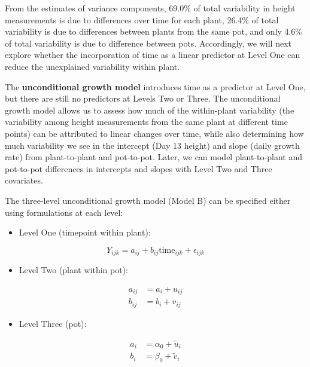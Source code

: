 \documentclass[
]{krantz}
\providecommand{\tightlist}{%
  \setlength{\itemsep}{0pt}\setlength{\parskip}{0pt}}
\begin{document}
From the estimates of variance components, 69.0\% of total variability in height measurements is due to differences over time for each plant, 26.4\% of total variability is due to differences between plants from the same pot, and only 4.6\% of total variability is due to difference between pots. Accordingly, we will next explore whether the incorporation of time as a linear predictor at Level One can reduce the unexplained variability within plant.

The \textbf{unconditional growth model}  introduces time as a predictor at Level One, but there are still no predictors at Levels Two or Three. The unconditional growth model allows us to assess how much of the within-plant variability (the variability among height measurements from the same plant at different time points) can be attributed to linear changes over time, while also determining how much variability we see in the intercept (Day 13 height) and slope (daily growth rate) from plant-to-plant and pot-to-pot. Later, we can model plant-to-plant and pot-to-pot differences in intercepts and slopes with Level Two and Three covariates.

The three-level unconditional growth model (Model B) can be specified either using formulations at each level:

\begin{itemize}
\tightlist
\item
  Level One (timepoint within plant):
\end{itemize}

\begin{equation*}
Y_{ijk} = a_{ij}+b_{ij}\textrm{time}_{ijk}+\epsilon_{ijk}
\end{equation*}

\begin{itemize}
\tightlist
\item
  Level Two (plant within pot):
\end{itemize}

\begin{align*}
a_{ij} & = a_{i}+u_{ij} \\
b_{ij} & = b_{i}+v_{ij}
\end{align*}

\begin{itemize}
\tightlist
\item
  Level Three (pot):
\end{itemize}

\begin{align*}
a_{i} & = \alpha_{0}+\tilde{u}_{i} \\
b_{i} & = \beta_{0}+\tilde{v}_{i}
\end{align*}
\end{document}
